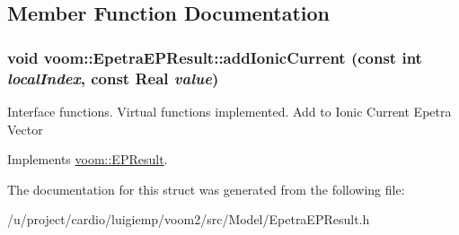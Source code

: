 \subsection{Member Function Documentation}
\hypertarget{structvoom_1_1_epetra_e_p_result_a3df34f3a42a943943577e7dce50d1036}{
\subsubsection[{addIonicCurrent}]{\setlength{\rightskip}{0pt plus 5cm}void voom::EpetraEPResult::addIonicCurrent (const int {\em localIndex}, \/  const Real {\em value})}}
\label{structvoom_1_1_epetra_e_p_result_a3df34f3a42a943943577e7dce50d1036}
Interface functions. Virtual functions implemented. Add to Ionic Current Epetra Vector 

Implements \hyperlink{structvoom_1_1_e_p_result}{voom::EPResult}.

The documentation for this struct was generated from the following file:\begin{DoxyCompactItemize}
\item 
/u/project/cardio/luigiemp/voom2/src/Model/EpetraEPResult.h\end{DoxyCompactItemize}
